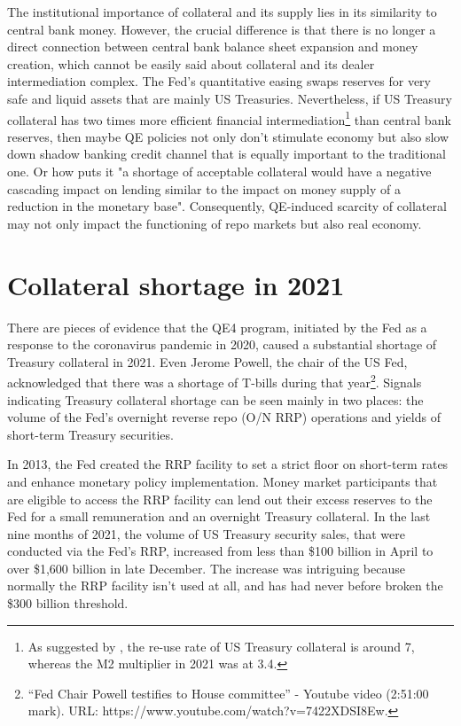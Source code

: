 \documentclass[11pt,a4paper,english,oneside]{article}
\begin{document}
The institutional importance of collateral and its supply lies in its similarity to central bank money. However, the crucial difference is that there is no longer a direct connection between central bank balance sheet expansion and money creation, which cannot be easily said about collateral and its dealer intermediation complex. The Fed's quantitative easing swaps reserves for very safe and liquid assets that are mainly US Treasuries. Nevertheless, if US Treasury collateral has two times more efficient financial intermediation\footnote{As suggested by \citet{infante2020}, the re-use rate of US Treasury collateral is around 7, whereas the M2 multiplier in 2021 was at 3.4.} than central bank reserves, then maybe QE policies not only don't stimulate economy but also slow down shadow banking credit channel that is equally important to the traditional one. Or how \citet{singh2020} puts it "a shortage of acceptable collateral would have a negative cascading impact on lending similar to the impact on money supply of a reduction in the monetary base". Consequently, QE-induced scarcity of collateral may not only impact the functioning of repo markets but also real economy.

\newpage

\section{Collateral shortage in 2021} \label{sec:shortage}%

There are pieces of evidence that the QE4 program, initiated by the Fed as a response to the coronavirus pandemic in 2020, caused a substantial shortage of Treasury collateral in 2021. Even Jerome Powell, the chair of the US Fed, acknowledged that there was a shortage of T-bills during that year\footnote{“Fed Chair Powell testifies to House committee” - Youtube video (2:51:00 mark). URL: https://www.youtube.com/watch?v=7422XDSI8Ew.}. Signals indicating Treasury collateral shortage can be seen mainly in two places: the volume of the Fed's overnight reverse repo (O/N RRP) operations and yields of short-term Treasury securities.

In 2013, the Fed created the RRP facility to set a strict floor on short-term rates and enhance monetary policy implementation. Money market participants that are eligible to access the RRP facility can lend out their excess reserves to the Fed for a small remuneration and an overnight Treasury collateral. In the last nine months of 2021, the volume of US Treasury security sales, that were conducted via the Fed's RRP, increased from less than \$100 billion in April to over \$1,600 billion in late December. The increase was intriguing because normally the RRP facility isn't used at all, and has had never before broken the \$300 billion threshold.
\end{document}
